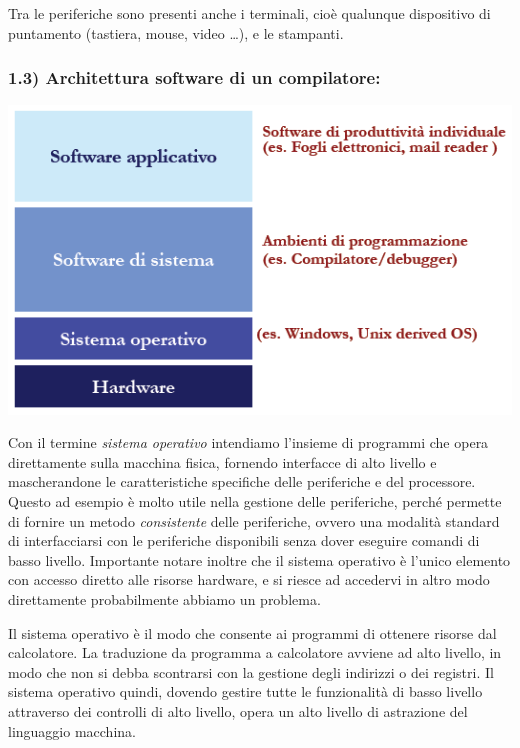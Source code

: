 \documentclass[
  paper=a4,
  oneside  ,captions=tableheading
]{scrbook}
\begin{document}
Tra le periferiche sono presenti anche i terminali, cioè qualunque
dispositivo di puntamento (tastiera, mouse, video \ldots), e le
stampanti.

\hypertarget{architettura-software-di-un-compilatore}{%
\subsubsection{1.3) Architettura software di un
compilatore:}\label{architettura-software-di-un-compilatore}}

\includegraphics{./image/image-20201112231919938.png}

Con il termine \emph{sistema operativo} intendiamo l'insieme di
programmi che opera direttamente sulla macchina fisica, fornendo
interfacce di alto livello e mascherandone le caratteristiche specifiche
delle periferiche e del processore. Questo ad esempio è molto utile
nella gestione delle periferiche, perché permette di fornire un metodo
\emph{consistente} delle periferiche, ovvero una modalità standard di
interfacciarsi con le periferiche disponibili senza dover eseguire
comandi di basso livello. Importante notare inoltre che il sistema
operativo è l'unico elemento con accesso diretto alle risorse hardware,
e si riesce ad accedervi in altro modo direttamente probabilmente
abbiamo un problema.

Il sistema operativo è il modo che consente ai programmi di ottenere
risorse dal calcolatore. La traduzione da programma a calcolatore
avviene ad alto livello, in modo che non si debba scontrarsi con la
gestione degli indirizzi o dei registri. Il sistema operativo quindi,
dovendo gestire tutte le funzionalità di basso livello attraverso dei
controlli di alto livello, opera un alto livello di astrazione del
linguaggio macchina.
\end{document}
